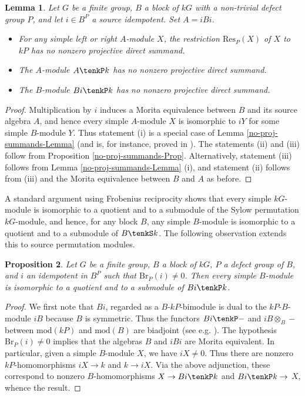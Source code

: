 \documentclass{amsart}
\theoremstyle{plain}\newtheorem{Theorem}{Theorem}[section]
\theoremstyle{plain}\newtheorem{Conjecture}[Theorem]{Conjecture}
\theoremstyle{plain}\newtheorem{Corollary}[Theorem]{Corollary}
\theoremstyle{plain}\newtheorem{Lemma}[Theorem]{Lemma}
\theoremstyle{plain}\newtheorem{Proposition}[Theorem]{Proposition}
\theoremstyle{definition}\newtheorem{Definition}[Theorem]{Definition}
\theoremstyle{definition}\newtheorem{Example}[Theorem]{Example}
\theoremstyle{definition}\newtheorem{Examples}[Theorem]{Examples}
\theoremstyle{definition}\newtheorem{Exercise}[Theorem]{Exercise}
\theoremstyle{definition}\newtheorem{Notation}[Theorem]{Notation}
\theoremstyle{definition}\newtheorem{Remark}[Theorem]{Remark}
\theoremstyle{definition}\newtheorem{Remarks}[Theorem]{Remarks}
\theoremstyle{plain}\newtheorem{Statement}[Theorem]{}
\def\Br{\mathrm{Br}}                 \def\ten{\otimes}
\def\mod{\mathrm{mod}}
\def\Res{\mathrm{Res}}           \def\tenOR{\otimes_{\mathcal{O}R}}
\begin{document}
\begin{Lemma} \label{proj-summands-Lemma}
Let $G$ be a finite group, $B$ a block of $kG$ with a non-trivial  defect group $P$, 
and let $i\in B^P$ a source idempotent. Set $A=iBi$. 

\begin{itemize}
\item[{\rm (i)}] 
For any simple left or right $A$-module $X$, the restriction $\Res_P(X)$ of $X$
to $kP$ has no nonzero projective direct summand.

\item[{\rm (ii)}]
The $A$-module $A\tenkP k$ has no nonzero projective direct summand.

\item[{\rm (iii)}]
The $B$-module $Bi\tenkP k$ has no nonzero projective direct summand.
\end{itemize} 
\end{Lemma}

\begin{proof}
Multiplication by $i$ induces a Morita equivalence between $B$ and its source
algebra $A$, and hence every simple $A$-module $X$ is isomorphic to $iY$
for some simple $B$-module $Y$. Thus statement (i) is a special case of Lemma 
\ref{no-proj-summands-Lemma} (and is,  for instance, proved in 
\cite[Proposition 6.4.11]{LiBookII}).
The statements (ii) and (iii) follow from Proposition \ref{no-proj-summands-Prop}.
Alternatively, statement (iii) follows from Lemma \ref{no-proj-summands-Lemma}
(i), and statement (ii) follows from (iii) and the Morita equivalence
between $B$ and $A$ as before.
\end{proof}

\medskip
A standard argument using Frobenius reciprocity shows that every simple
$kG$-module is isomorphic to a quotient and to a submodule of the Sylow
permutation $kG$-module, and hence, for any block $B$,
any simple $B$-module is isomorphic to a quotient and to a submodule of
$B\tenkS k$. The following observation extends this to source permutation
modules. 

\begin{Proposition} \label{Bi-top-socle}
Let $G$ be a finite group, $B$ a block of $kG$, $P$ a defect group of $B$,
and $i$ an idempotent in $B^P$ such that $\Br_P(i)\neq 0$.
Then every simple $B$-module is isomorphic to a quotient and to a
submodule of $Bi\tenkP k$.
\end{Proposition}

\begin{proof}
We first note that $Bi$, regarded as a $B$-$kP$-bimodule is dual to the
$kP$-$B$-module $iB$ because $B$ is symmetric. Thus
the functors $Bi\tenkP -$ and $iB \ten_B -$ between $\mod(kP)$ and $\mod(B)$
are biadjoint (see e.g. \cite[Theorem 2.12.7]{LiBookI}). 
The hypothesis $\Br_P(i)\neq 0$ implies that the algebras $B$ and $iBi$ are 
Morita equivalent. In particular, given a simple $B$-module $X$, we have $iX\neq 0$.  
Thus there are nonzero $kP$-homomorphisms
$iX\to k$ and $k\to iX$. Via the above adjunction, these correspond to
nonzero $B$-homomorphisms $X\to Bi\tenkP k$ and $Bi\tenkP k\to$ $X$,
whence the result.
\end{proof} 
\end{document}
